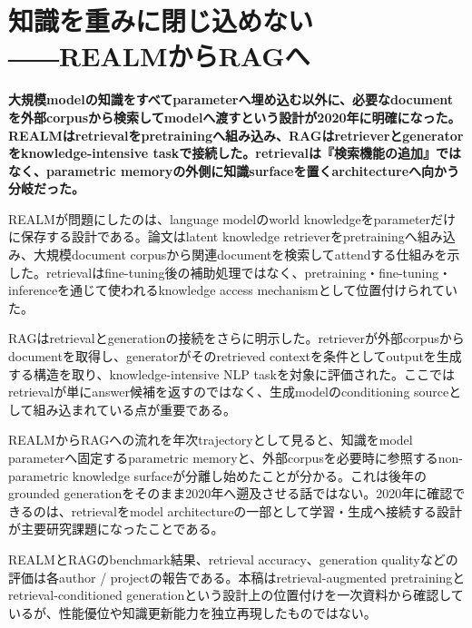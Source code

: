 \section{知識を重みに閉じ込めない――REALMからRAGへ}
\label{pkg:retrieval-grounding}
\noindent\textbf{大規模modelの知識をすべてparameterへ埋め込む以外に、必要なdocumentを外部corpusから検索してmodelへ渡すという設計が2020年に明確になった。REALMはretrievalをpretrainingへ組み込み、RAGはretrieverとgeneratorをknowledge-intensive taskで接続した。retrievalは『検索機能の追加』ではなく、parametric memoryの外側に知識surfaceを置くarchitectureへ向かう分岐だった。}\autocite{src-38c08ba169f1,src-4bf65d8fc7dc,src-c441b6f2b8f4}

REALMが問題にしたのは、language modelのworld knowledgeをparameterだけに保存する設計である。論文はlatent knowledge retrieverをpretrainingへ組み込み、大規模document corpusから関連documentを検索してattendする仕組みを示した。retrievalはfine-tuning後の補助処理ではなく、pretraining・fine-tuning・inferenceを通じて使われるknowledge access mechanismとして位置付けられていた。\autocite{src-4bf65d8fc7dc}


RAGはretrievalとgenerationの接続をさらに明示した。retrieverが外部corpusからdocumentを取得し、generatorがそのretrieved contextを条件としてoutputを生成する構造を取り、knowledge-intensive NLP taskを対象に評価された。ここではretrievalが単にanswer候補を返すのではなく、生成modelのconditioning sourceとして組み込まれている点が重要である。\autocite{src-38c08ba169f1,src-c441b6f2b8f4}


REALMからRAGへの流れを年次trajectoryとして見ると、知識をmodel parameterへ固定するparametric memoryと、外部corpusを必要時に参照するnon-parametric knowledge surfaceが分離し始めたことが分かる。これは後年のgrounded generationをそのまま2020年へ遡及させる話ではない。2020年に確認できるのは、retrievalをmodel architectureの一部として学習・生成へ接続する設計が主要研究課題になったことである。\autocite{src-38c08ba169f1,src-4bf65d8fc7dc,src-c441b6f2b8f4}


\begin{claimboundary}
REALMとRAGのbenchmark結果、retrieval accuracy、generation qualityなどの評価は各author / projectの報告である。本稿はretrieval-augmented pretrainingとretrieval-conditioned generationという設計上の位置付けを一次資料から確認しているが、性能優位や知識更新能力を独立再現したものではない。\autocite{src-38c08ba169f1,src-4bf65d8fc7dc,src-c441b6f2b8f4}
\end{claimboundary}
